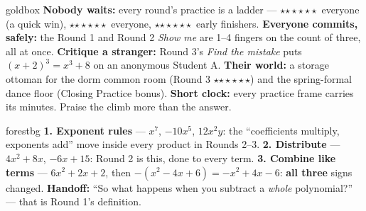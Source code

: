 \documentclass[10pt]{article}
\newcommand{\rung}[1]{{\color{goldacc}\ifcase#1\or$\star$\or$\star\star$\or$\star\star\star$\fi}}
\begin{document}
\begin{skillbox}{goldbox}
\textbf{Nobody waits:} every round's practice is a ladder --- \rung1\ everyone (a quick win),
\rung2\ everyone, \rung3\ early finishers. \textbf{Everyone commits, safely:} the Round 1 and
Round 2 \emph{Show me} are 1--4 fingers on the count of three, all at once. \textbf{Critique a
stranger:} Round 3's \emph{Find the mistake} puts $(x+2)^3=x^3+8$ on an anonymous Student A.
\textbf{Their world:} a storage ottoman for the dorm common room (Round 3 \rung3) and the
spring-formal dance floor (Closing Practice bonus). \textbf{Short clock:} every practice frame carries its
minutes. Praise the climb more than the answer.
\end{skillbox}

\begin{skillbox}{forestbg}
\textbf{1. Exponent rules} --- $x^7$, $-10x^5$, $12x^2y$: the ``coefficients multiply, exponents
add'' move inside every product in Rounds 2--3. \textbf{2. Distribute} --- $4x^2+8x$,
$-6x+15$: Round 2 is this, done to every term. \textbf{3. Combine like terms} ---
$6x^2+2x+2$, then $-(x^2-4x+6)=-x^2+4x-6$: \textbf{all three} signs changed. \textbf{Handoff:}
``So what happens when you subtract a \emph{whole} polynomial?'' --- that is Round 1's
definition.
\end{skillbox}
\end{document}
